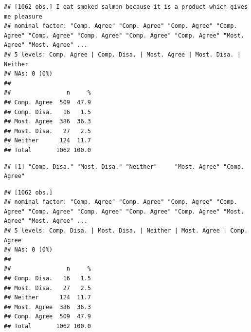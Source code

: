 \documentclass[
]{book}
\newenvironment{Shaded}{\begin{snugshade}}{\end{snugshade}}
\newcommand{\AttributeTok}[1]{\textcolor[rgb]{0.77,0.63,0.00}{#1}}
\newcommand{\CommentTok}[1]{\textcolor[rgb]{0.56,0.35,0.01}{\textit{#1}}}
\newcommand{\FunctionTok}[1]{\textcolor[rgb]{0.00,0.00,0.00}{#1}}
\newcommand{\NormalTok}[1]{#1}
\newcommand{\OtherTok}[1]{\textcolor[rgb]{0.56,0.35,0.01}{#1}}
\newcommand{\SpecialCharTok}[1]{\textcolor[rgb]{0.00,0.00,0.00}{#1}}
\newcommand{\StringTok}[1]{\textcolor[rgb]{0.31,0.60,0.02}{#1}}
\begin{document}
\begin{Shaded}
\end{Shaded}

\begin{verbatim}
## [1062 obs.] I eat smoked salmon because it is a product which gives me pleasure
## nominal factor: "Comp. Agree" "Comp. Agree" "Comp. Agree" "Comp. Agree" "Comp. Agree" "Comp. Agree" "Comp. Agree" "Comp. Agree" "Most. Agree" "Most. Agree" ...
## 5 levels: Comp. Agree | Comp. Disa. | Most. Agree | Most. Disa. | Neither
## NAs: 0 (0%)
## 
##                n     %
## Comp. Agree  509  47.9
## Comp. Disa.   16   1.5
## Most. Agree  386  36.3
## Most. Disa.   27   2.5
## Neither      124  11.7
## Total       1062 100.0
\end{verbatim}

\begin{Shaded}
\end{Shaded}

\begin{verbatim}
## [1] "Comp. Disa." "Most. Disa." "Neither"     "Most. Agree" "Comp. Agree"
\end{verbatim}

\begin{Shaded}
\end{Shaded}

\begin{verbatim}
## [1062 obs.] 
## nominal factor: "Comp. Agree" "Comp. Agree" "Comp. Agree" "Comp. Agree" "Comp. Agree" "Comp. Agree" "Comp. Agree" "Comp. Agree" "Most. Agree" "Most. Agree" ...
## 5 levels: Comp. Disa. | Most. Disa. | Neither | Most. Agree | Comp. Agree
## NAs: 0 (0%)
## 
##                n     %
## Comp. Disa.   16   1.5
## Most. Disa.   27   2.5
## Neither      124  11.7
## Most. Agree  386  36.3
## Comp. Agree  509  47.9
## Total       1062 100.0
\end{verbatim}
\end{document}
